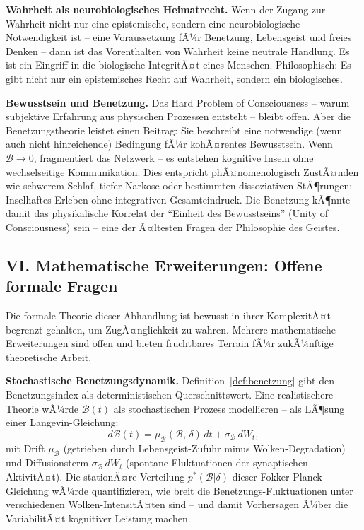 ﻿\documentclass[12pt,a4paper]{report}
\theoremstyle{plain}
\theoremstyle{definition}
\theoremstyle{remark}
\begin{document}
	\textbf{Wahrheit als neurobiologisches Heimatrecht.}
	Wenn der Zugang zur Wahrheit nicht nur eine epistemische,
	sondern eine neurobiologische Notwendigkeit ist --
	eine Voraussetzung fÃ¼r Benetzung, Lebensgeist und freies Denken --
	dann ist das Vorenthalten von Wahrheit keine neutrale Handlung.
	Es ist ein Eingriff in die biologische IntegritÃ¤t eines Menschen.
	Philosophisch: Es gibt nicht nur ein epistemisches Recht auf Wahrheit,
	sondern ein biologisches.

	\textbf{Bewusstsein und Benetzung.}
	Das Hard Problem of Consciousness -- warum subjektive Erfahrung
	aus physischen Prozessen entsteht -- bleibt offen.
	Aber die Benetzungstheorie leistet einen Beitrag:
	Sie beschreibt eine notwendige (wenn auch nicht hinreichende)
	Bedingung fÃ¼r kohÃ¤rentes Bewusstsein.
	Wenn $\mathcal{B} \to 0$, fragmentiert das Netzwerk --
	es entstehen kognitive Inseln ohne wechselseitige Kommunikation.
	Dies entspricht phÃ¤nomenologisch ZustÃ¤nden wie schwerem Schlaf,
	tiefer Narkose oder bestimmten dissoziativen StÃ¶rungen:
	Inselhaftes Erleben ohne integrativen Gesamteindruck.
	Die Benetzung kÃ¶nnte damit das physikalische Korrelat der
	``Einheit des Bewusstseins'' (Unity of Consciousness) sein --
	eine der Ã¤ltesten Fragen der Philosophie des Geistes.

	\subsection*{VI. Mathematische Erweiterungen: Offene formale Fragen}

	Die formale Theorie dieser Abhandlung ist bewusst in ihrer
	KomplexitÃ¤t begrenzt gehalten, um ZugÃ¤nglichkeit zu wahren.
	Mehrere mathematische Erweiterungen sind offen und bieten
	fruchtbares Terrain fÃ¼r zukÃ¼nftige theoretische Arbeit.

	\textbf{Stochastische Benetzungsdynamik.}
	Definition~\ref{def:benetzung} gibt den Benetzungsindex als
	deterministischen Querschnittswert. Eine realistischere Theorie
	wÃ¼rde $\mathcal{B}(t)$ als stochastischen Prozess modellieren --
	als LÃ¶sung einer Langevin-Gleichung:
	\[
	d\mathcal{B}(t)
	= \mu_{\mathcal{B}}(\mathcal{B},\,\delta)\,dt
	+ \sigma_{\mathcal{B}}\,dW_t,
	\]
	mit Drift $\mu_{\mathcal{B}}$ (getrieben durch Lebensgeist-Zufuhr minus
	Wolken-Degradation) und Diffusionsterm $\sigma_{\mathcal{B}}\,dW_t$
	(spontane Fluktuationen der synaptischen AktivitÃ¤t).
	Die stationÃ¤re Verteilung $p^*(\mathcal{B}|\delta)$ dieser
	Fokker-Planck-Gleichung wÃ¼rde quantifizieren, wie breit die
	Benetzungs-Fluktuationen unter verschiedenen Wolken-IntensitÃ¤ten sind --
	und damit Vorhersagen Ã¼ber die VariabilitÃ¤t kognitiver Leistung machen.
\end{document}
